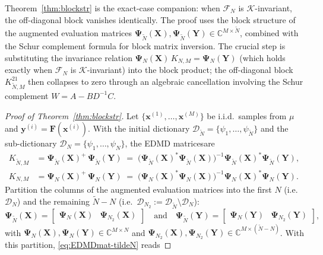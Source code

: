 \documentclass{article}
\theoremstyle{plain}
\theoremstyle{definition}
\def\X{\mathbf{X}}
\def\x{\mathbf{x}}
\def\Y{\mathbf{Y}}
\def\y{\mathbf{y}}
\def\Koop{\mathcal{K}}
\def\Fc{\mathcal{F}}
\def\Dc{\mathcal{D}}
\newcommand{\arXivtag}[1][]{#1}
\begin{document}
Theorem~\ref{thm:blockstr} is the exact-case companion: when $\Fc_N$ is $\Koop$-invariant, the off-diagonal block vanishes identically. The proof uses the block structure of the augmented evaluation matrices $\mathbf{\Psi}_{\tilde{N}}(\X),\mathbf{\Psi}_{\tilde{N}}(\Y) \in \mathbb{C}^{M\times\tilde N}$, combined with the Schur complement formula for block matrix inversion. The crucial step is substituting the invariance relation $\mathbf{\Psi}_N(\X)\,K_{N,M} = \mathbf{\Psi}_N(\Y)$ (which holds exactly when $\Fc_N$ is $\Koop$-invariant) into the block product; the off-diagonal block $K_{\tilde N,M}^{21}$ then collapses to zero through an algebraic cancellation involving the Schur complement $W = A - BD^{-1}C$.

\begin{proof}[Proof of Theorem~\ref{thm:blockstr}]
	Let $\{\x^{(1)}, \ldots, \x^{(M)}\}$ be i.i.d.\ samples from $\mu$ and $\y^{(i)} = \mathbf{F}(\x^{(i)})$. \arXivtag[With the initial dictionary $\Dc_{\tilde N}=\{\psi_1, \ldots, \psi_{\tilde N}\}$ and the sub-dictionary $\Dc_{N}=\{\psi_1, \ldots, \psi_N\}$], the EDMD matrices\arXivtag are
	\begin{align}
		K_{\tilde N, M} & = \mathbf{\Psi}_{\tilde N}(\X)^{+}\,\mathbf{\Psi}_{\tilde N}(\Y) \;=\; \bigl(\mathbf{\Psi}_{\tilde N}(\X)^{*}\mathbf{\Psi}_{\tilde N}(\X)\bigr)^{-1}\mathbf{\Psi}_{\tilde N}(\X)^{*}\mathbf{\Psi}_{\tilde N}(\Y), \label{eq:EDMDmat-tildeN} \\
        K_{N, M} & = \mathbf{\Psi}_{N}(\X)^{+}\,\mathbf{\Psi}_{N}(\Y) \;=\; \bigl(\mathbf{\Psi}_{N}(\X)^{*}\mathbf{\Psi}_{N}(\X)\bigr)^{-1}\mathbf{\Psi}_{N}(\X)^{*}\mathbf{\Psi}_{N}(\Y). \label{eq:EDMDmat-N}
	\end{align}\arXivtag
	Partition the columns of the augmented evaluation matrices into the first $N$ (i.e.\ $\Dc_N$) and the remaining $\tilde N - N$ (i.e.\ $\Dc_{N_2} := \Dc_{\tilde N}\setminus\Dc_N$):
	\begin{equation*}
		\mathbf{\Psi}_{\tilde N}(\X) = \begin{bmatrix} \mathbf{\Psi}_{N}(\X) & \arXivtag[\mathbf{\Psi}_{N_2}](\X) \end{bmatrix}
		\quad\text{and}\quad
		\mathbf{\Psi}_{\tilde N}(\Y) = \begin{bmatrix} \mathbf{\Psi}_{N}(\Y) & \arXivtag[\mathbf{\Psi}_{N_2}](\Y) \end{bmatrix},
	\end{equation*}
	with $\mathbf{\Psi}_{N}(\X),\mathbf{\Psi}_{N}(\Y) \in \mathbb{C}^{M\times N}$ and $\arXivtag[\mathbf{\Psi}_{N_2}](\X),\arXivtag[\mathbf{\Psi}_{N_2}](\Y) \in \mathbb{C}^{M\times(\tilde N - N)}$. With this partition, \eqref{eq:EDMDmat-tildeN} reads

\end{proof}
\end{document}
